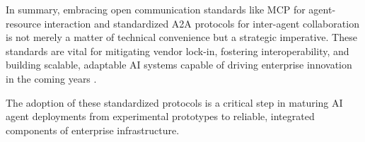 In summary, embracing open communication standards like MCP for agent-resource interaction and standardized A2A protocols for inter-agent collaboration is not merely a matter of technical convenience but a strategic imperative. These standards are vital for mitigating vendor lock-in, fostering interoperability, and building scalable, adaptable AI systems capable of driving enterprise innovation in the coming years \cite{Reger2026, MCPspec, LinuxFoundationA2A}.

The adoption of these standardized protocols is a critical step in maturing AI agent deployments from experimental prototypes to reliable, integrated components of enterprise infrastructure.
